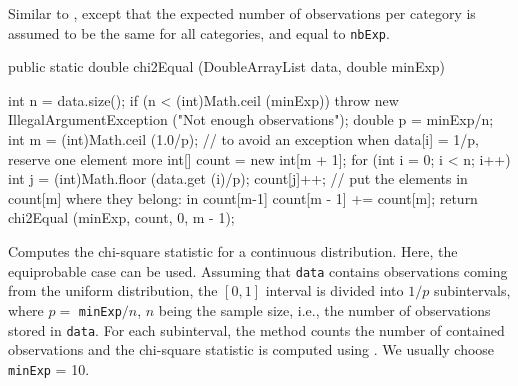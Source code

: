 \begin{tabb}  Similar to ,
   except that the expected
  number of observations per category is assumed to be the same for
  all categories, and equal to \texttt{nbExp}.
\end{tabb}
\begin{htmlonly}
\end{htmlonly}
\begin{code}

   public static double chi2Equal (DoubleArrayList data, double minExp)\begin{hide} {
      int n = data.size();
      if (n < (int)Math.ceil (minExp))
         throw new IllegalArgumentException ("Not enough observations");
      double p = minExp/n;
      int m = (int)Math.ceil (1.0/p);
      // to avoid an exception when data[i] = 1/p, reserve one element more
      int[] count = new int[m + 1];
      for (int i = 0; i < n; i++) {
         int j = (int)Math.floor (data.get (i)/p);
         count[j]++;
      }
      // put the elements in count[m] where they belong: in count[m-1]
      count[m - 1] += count[m];
      return chi2Equal (minExp, count, 0, m - 1);
   }\end{hide}
\end{code}
\begin{tabb}   Computes the chi-square statistic for a continuous distribution.
   Here, the equiprobable case can be used.  Assuming that \texttt{data} contains
   observations coming from the uniform distribution, the $[0,1]$ interval
   is divided into $1/p$ subintervals, where $p=$ \texttt{minExp}$/n$, $n$
   being the sample size, i.e., the number of observations stored in
   \texttt{data}.  For each subinterval, the method counts the number of
   contained observations and the chi-square statistic is computed
   using .
   We usually choose \texttt{minExp} = 10.
\end{tabb}
\begin{htmlonly}
   \param{data}{array of observations in $[0,1)$}
\end{htmlonly}
